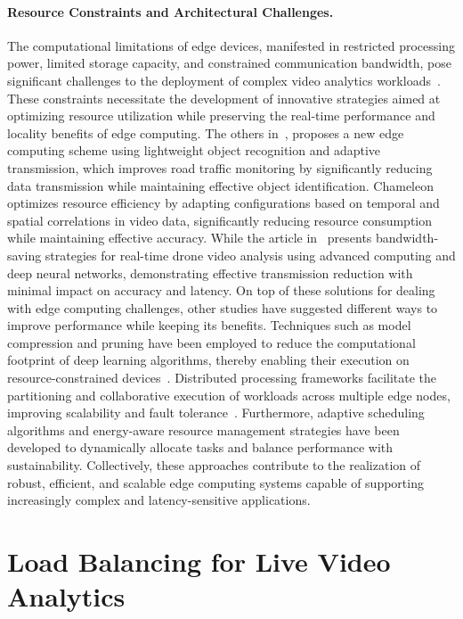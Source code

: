\paragraph{Resource Constraints and Architectural Challenges.}
The computational limitations of edge devices, manifested in restricted processing power, limited storage capacity, and constrained communication bandwidth, pose significant challenges to the deployment of complex video analytics workloads~\cite{badidi2023opportunities,kumar2021resource,jiang2018chameleon,wang2018bandwidth}. These constraints necessitate the development of innovative strategies aimed at optimizing resource utilization while preserving the real-time performance and locality benefits of edge computing. The others in~\cite{kumar2021resource}, proposes a new edge computing scheme using lightweight object recognition and adaptive transmission, which improves road traffic monitoring by significantly reducing data transmission while maintaining effective object identification. Chameleon~\cite{jiang2018chameleon} optimizes resource efficiency by adapting configurations based on temporal and spatial correlations in video data, significantly reducing resource consumption while maintaining effective accuracy. While the article in~\cite{wang2018bandwidth} presents bandwidth-saving strategies for real-time drone video analysis using advanced computing and deep neural networks, demonstrating effective transmission reduction with minimal impact on accuracy and latency.
On top of these solutions for dealing with edge computing challenges, other studies have suggested different ways to improve performance while keeping its benefits. Techniques such as model compression and pruning have been employed to reduce the computational footprint of deep learning algorithms, thereby enabling their execution on resource-constrained devices~\cite{eccles2024dnnshifter}. Distributed processing frameworks facilitate the partitioning and collaborative execution of workloads across multiple edge nodes, improving scalability and fault tolerance~\cite{rachuri2021decentralized,zeng2020distream,201465videostorm}. Furthermore, adaptive scheduling algorithms and energy-aware resource management strategies have been developed to dynamically allocate tasks and balance performance with sustainability. Collectively, these approaches contribute to the realization of robust, efficient, and scalable edge computing systems capable of supporting increasingly complex and latency-sensitive applications.


\section{Load Balancing for Live Video Analytics}\label{sec:load_balancing_for_live_video_analytics}

